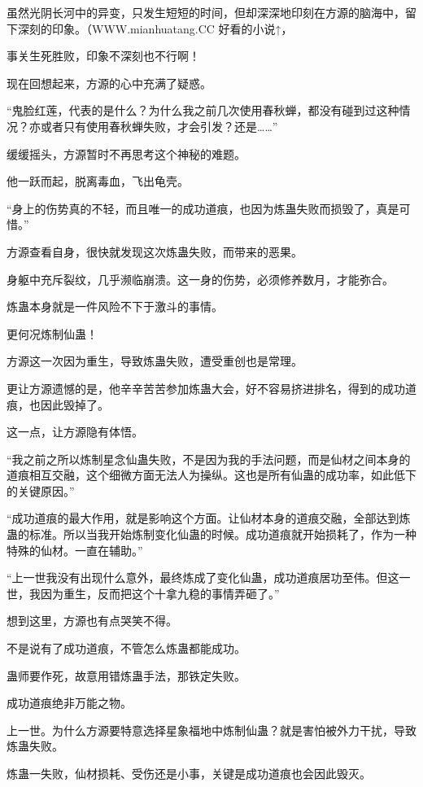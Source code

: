 
\begin{this_body}

虽然光阴长河中的异变，只发生短短的时间，但却深深地印刻在方源的脑海中，留下深刻的印象。（WWW.mianhuatang.CC 好看的小说↑，

事关生死胜败，印象不深刻也不行啊！

现在回想起来，方源的心中充满了疑惑。

“鬼脸红莲，代表的是什么？为什么我之前几次使用春秋蝉，都没有碰到过这种情况？亦或者只有使用春秋蝉失败，才会引发？还是……”

缓缓摇头，方源暂时不再思考这个神秘的难题。

他一跃而起，脱离毒血，飞出龟壳。

“身上的伤势真的不轻，而且唯一的成功道痕，也因为炼蛊失败而损毁了，真是可惜。”

方源查看自身，很快就发现这次炼蛊失败，而带来的恶果。

身躯中充斥裂纹，几乎濒临崩溃。这一身的伤势，必须修养数月，才能弥合。

炼蛊本身就是一件风险不下于激斗的事情。

更何况炼制仙蛊！

方源这一次因为重生，导致炼蛊失败，遭受重创也是常理。

更让方源遗憾的是，他辛辛苦苦参加炼蛊大会，好不容易挤进排名，得到的成功道痕，也因此毁掉了。

这一点，让方源隐有体悟。

“我之前之所以炼制星念仙蛊失败，不是因为我的手法问题，而是仙材之间本身的道痕相互交融，这个细微方面无法人为操纵。这也是所有仙蛊的成功率，如此低下的关键原因。”

“成功道痕的最大作用，就是影响这个方面。让仙材本身的道痕交融，全部达到炼蛊的标准。所以当我开始炼制变化仙蛊的时候。成功道痕就开始损耗了，作为一种特殊的仙材。一直在辅助。”

“上一世我没有出现什么意外，最终炼成了变化仙蛊，成功道痕居功至伟。但这一世，我因为重生，反而把这个十拿九稳的事情弄砸了。”

想到这里，方源也有点哭笑不得。

不是说有了成功道痕，不管怎么炼蛊都能成功。

蛊师要作死，故意用错炼蛊手法，那铁定失败。

成功道痕绝非万能之物。

上一世。为什么方源要特意选择星象福地中炼制仙蛊？就是害怕被外力干扰，导致炼蛊失败。

炼蛊一失败，仙材损耗、受伤还是小事，关键是成功道痕也会因此毁灭。


\end{this_body}
